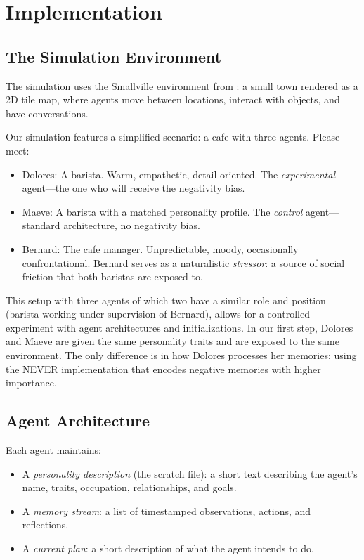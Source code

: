 \section{Implementation}

\subsection{The Simulation Environment}

The simulation uses the Smallville environment from \citet{park2023generative}: a small town rendered as a 2D tile map, where agents move between locations, interact with objects, and have conversations.

Our simulation features a simplified scenario: a cafe with three agents. Please meet:
\begin{itemize}
    \item Dolores: A barista. Warm, empathetic, detail-oriented. The \emph{experimental} agent---the one who will receive the negativity bias.
    \item Maeve: A barista with a matched personality profile. The \emph{control} agent---standard architecture, no negativity bias.
    \item Bernard: The cafe manager. Unpredictable, moody, occasionally confrontational. Bernard serves as a naturalistic \emph{stressor}: a source of social friction that both baristas are exposed to.
\end{itemize}
%
This setup with three agents of which two have a similar role and position (barista working under supervision of Bernard), allows for a controlled experiment with agent architectures and initializations. In our first step, Dolores and Maeve are given the same personality traits and are exposed to the same environment. The only difference is in how Dolores processes her memories: using the NEVER implementation that encodes negative memories with higher importance.

\subsection{Agent Architecture}

Each agent maintains:
\begin{itemize}
    \item A \textit{personality description} (the scratch file): a short text describing the agent's name, traits, occupation, relationships, and goals.
    \item A \textit{memory stream}: a list of timestamped observations, actions, and reflections.
    \item A \textit{current plan}: a short description of what the agent intends to do.
\end{itemize}

